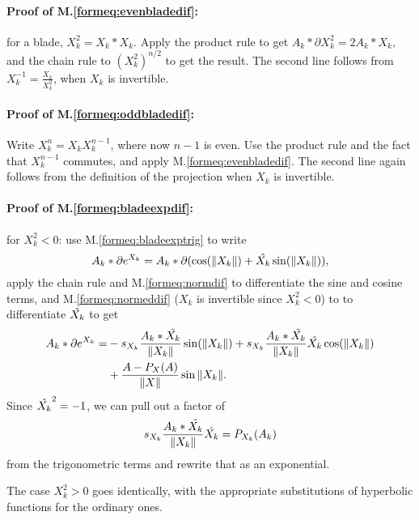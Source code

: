 \documentclass[a4paper,12pt]{article}
\newcommand{\meqref}[1]{M.\eqref{form#1}}
\theoremstyle{definition}
\begin{document}
\paragraph{Proof of \meqref{eq:evenbladedif}:} for a blade, $X_k^2 = X_k * X_k$.
Apply the product rule to get $A_k*\partial X_k^2 = 2 A_k * X_k$, and the chain rule to $(X_k^2)^{n/2}$ to get the result.
The second line follows from $X_k^{-1} = \frac{X_k}{X_k^2}$, when $X_k$ is invertible.

\paragraph{Proof of \meqref{eq:oddbladedif}:} Write $X_k^n = X_k X_k^{n-1}$, where now $n-1$ is even.
Use the product rule and the fact that $X_k^{n-1}$ commutes, and apply \meqref{eq:evenbladedif}.
The second line again follows from the definition of the projection when $X_k$ is invertible.

\paragraph{Proof of \meqref{eq:bladeexpdif}:} for $X_k^2 < 0$: use \meqref{eq:bladeexptrig} to write
\begin{equation}
A_k * \partial e^{X_k} = A_k * \partial(\cos(\left\lVert X_k\right\rVert) + \hat{X_k} \sin(\left\lVert X_k\right\rVert)),
\end{equation}
apply the chain rule and \meqref{eq:normdif} to differentiate the sine and cosine terms, and \meqref{eq:normeddif} ($X_k$ is invertible since $X_k^2 < 0$) to to differentiate $\hat{X_k}$ to get
\begin{equation}
\begin{split}
A_k * \partial e^{X_k} =& -s_{X_k}\frac{A_k*\tilde{X_k}}{\left\lVert X_k\right\rVert}\sin(\left\lVert X_k\right\rVert) + s_{X_k}\frac{A_k*\tilde{X_k}}{\left\lVert X_k\right\rVert} \hat{X_k} \cos(\left\lVert X_k\right\rVert)\\
 &+ \frac{A- P_{X}(A)}{\left\lVert X\right\rVert} \sin{\left\lVert X_k\right\rVert}.
\end{split}
\end{equation}
Since $\hat{X_k}^2 = -1$, we can pull out a factor of
\begin{equation*}
s_{X_k}\frac{A_k*\tilde{X_k}}{\left\lVert X_k\right\rVert}\hat{X_k} = P_{X_k}(A_k)
\end{equation*}
from the trigonometric terms and rewrite that as an exponential.

The case $X_k^2 > 0$ goes identically, with the appropriate substitutions of hyperbolic functions for the ordinary ones.
\end{document}
